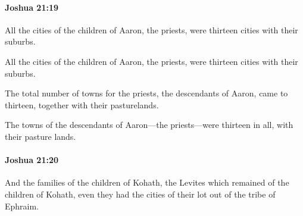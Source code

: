 		\paragraph{Joshua 21:19} %
			\label{JOSHUA-21-19}

			All the cities of the children of Aaron, the priests, were thirteen cities with their suburbs.

			\begin{versebox}
					\item[BHS] 
					\item[ASV] All the cities of the children of Aaron, the priests, were thirteen cities with their suburbs.
					\item[NIV] The total number of towns for the priests, the descendants of Aaron, came to thirteen, together with their pasturelands.
					\item[NRSV] The towns of the descendants of Aaron—the priests—were thirteen in all, with their pasture lands.
			\end{versebox}

		\paragraph{Joshua 21:20} %
			\label{JOSHUA-21-20}

			And the families of the children of Kohath, the Levites which remained of the children of Kohath, even they had the cities of their lot out of the tribe of Ephraim.

